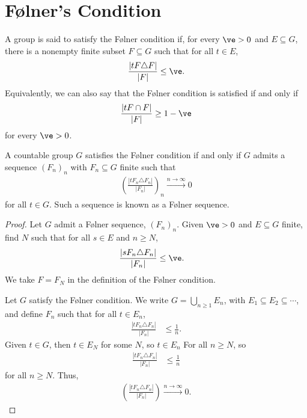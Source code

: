 \section{Følner's Condition}%
\begin{definition}\label{def:folner_condition}
  A group is said to satisfy the {Følner condition} if, for every $\ve > 0$ and $E\subseteq G$, there is a nonempty finite subset $F\subseteq G$ such that for all $t\in E$,
  \begin{align*}
    \frac{\left\vert tF\triangle F \right\vert}{\left\vert F \right\vert}\leq \ve.
  \end{align*}
  Equivalently, we can also say that the Følner condition is satisfied if and only if
  \begin{align*}
    \frac{\left\vert tF\cap F \right\vert}{\left\vert F \right\vert} \geq 1 - \ve
  \end{align*}
  for every $\ve > 0$.
\end{definition}
\begin{lemma}\label{lemma:folner_sequences}
  A countable group $G$ satisfies the Følner condition if and only if $G$ admits a sequence $\left(F_n\right)_n$ with $F_n\subseteq G$ finite such that
  \begin{align*}
    \left(\frac{\left\vert tF_n\triangle F_n \right\vert}{\left\vert F_n \right\vert}\right)_n \xrightarrow{n\rightarrow \infty}0
  \end{align*}
  for all $t\in G$. Such a sequence is known as a Følner sequence.
\end{lemma}
\begin{proof}
  Let $G$ admit a Følner sequence, $\left(F_n\right)_n$. Given $\ve > 0$ and $E\subseteq G$ finite, find $N$ such that for all $s\in E$ and $n\geq N$,
  \begin{align*}
    \frac{\left\vert sF_n\triangle F_n \right\vert}{\left\vert F_n \right\vert} &\leq \ve.
  \end{align*}
  We take $F = F_N$ in the definition of the Følner condition.\newline

  Let $G$ satisfy the Følner condition. We write $G = \bigcup_{n\geq 1}E_n$, with $E_1\subseteq E_2\subseteq \cdots$, and define $F_n$ such that for all $t\in E_n$,
  \begin{align*}
    \frac{\left\vert tF_n\triangle F_n \right\vert}{\left\vert F_n \right\vert} &\leq \frac{1}{n}.
  \end{align*}
  Given $t\in G$, then $t\in E_N$ for some $N$, so $t\in E_n$ For all $n\geq N$, so
  \begin{align*}
    \frac{\left\vert tF_n\triangle F_n \right\vert}{\left\vert F_n \right\vert} &\leq \frac{1}{n}
  \end{align*}
  for all $n\geq N$. Thus,
  \begin{align*}
    \left(\frac{\left\vert tF_n\triangle F_n \right\vert}{\left\vert F_n \right\vert}\right)\xrightarrow{n\rightarrow\infty}0.
  \end{align*}
\end{proof}
